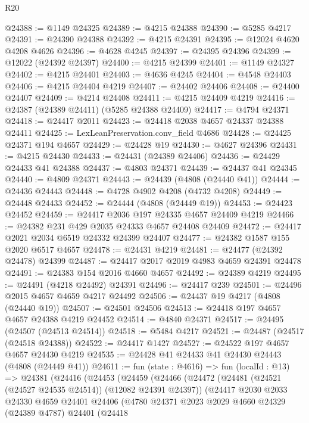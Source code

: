 \begin{lexlean}{R20}
\begin{coremodule}
@24388 := @1149 @24325
@24389 := @4215 @24388
@24390 := @5285 @4217
@24391 := @24390 @24388
@24392 := @4215 @24391
@24395 := @12024 @4620 @4208 @4626
@24396 := @4628 @4245
@24397 := @24395 @24396
@24399 := @12022 (@24392 @24397)
@24400 := @4215 @24399
@24401 := @1149 @24327
@24402 := @4215 @24401
@24403 := @4636 @4245
@24404 := @4548 @24403
@24406 := @4215 @24404 @4219
@24407 := @24402 @24406
@24408 := @24400 @24407
@24409 := @4214 @24408
@24411 := @4215 @24409 @4219
@24416 := @24387 (@24389 @24411) (@5285 @24388 @24409)
@24417 := @4794 @24371
@24418 := @24417 @2011
@24423 := @24418 @2038 @4657 @24337 @24388 @24411
@24425 := LexLeanPreservation.conv_field @4686
@24428 := @24425 @24371 @194 @4657
@24429 := @24428 @19
@24430 := @4627 @24396
@24431 := @4215 @24430
@24433 := @24431 (@24389 @24406)
@24436 := @24429 @24433 @41 @24388
@24437 := @4803 @24371
@24439 := @24437 @41 @24345
@24440 := @4809 @24371
@24443 := @24439 (@4808 (@24440 @41))
@24444 := @24436 @24443
@24448 := @4728 @4902 @4208 (@4732 @4208)
@24449 := @24448 @24433
@24452 := @24444 (@4808 (@24449 @19))
@24453 := @24423 @24452
@24459 := @24417 @2036 @197 @24335 @4657 @24409 @4219
@24466 := @24382 @231 @429 @2035 @24333 @4657 @24408 @24409
@24472 := @24417 @2021 @2034 @6519 @24332 @24399 @24407
@24477 := @24382 @1587 @155 @2020 @6517 @4657
@24478 := @24431 @4219
@24481 := @24477 (@24392 @24478) @24399
@24487 := @24417 @2017 @2019 @4983 @4659 @24391 @24478
@24491 := @24383 @154 @2016 @4660 @4657
@24492 := @24389 @4219
@24495 := @24491 (@4218 @24492) @24391
@24496 := @24417 @239
@24501 := @24496 @2015 @4657 @4659 @4217 @24492
@24506 := @24437 @19 @4217 (@4808 (@24440 @19))
@24507 := @24501 @24506
@24513 := @24418 @197 @4657 @4657 @24388 @4219 @24452
@24514 := @4840 @24371
@24517 := @24495 (@24507 (@24513 @24514))
@24518 := @5484 @4217
@24521 := @24487 (@24517 (@24518 @24388))
@24522 := @24417 @1427
@24527 := @24522 @197 @4657 @4657 @24430 @4219
@24535 := @24428 @41 @24433 @41 @24430 @24443 (@4808 (@24449 @41))
@24611 := fun (state : @4616) =>
  fun (localId : @13) =>
  @24381
    (@24416
      (@24453
        (@24459
          (@24466
            (@24472
              (@24481 (@24521 (@24527 @24535 @24514)) (@12082 @24391 @24397))
              (@24417
                @2030
                @2033
                @24330
                @4659
                @24401
                @24406
                (@4780
                  @24371
                  @2023
                  @2029
                  @4660
                  @24329
                  (@24389 @4787)
                  @24401
                  (@24418

\end{coremodule}
\end{lexlean}
